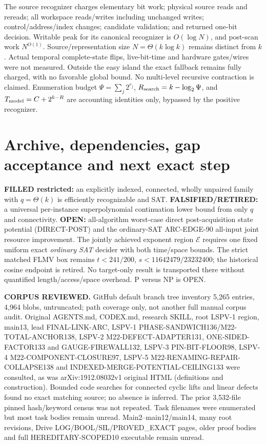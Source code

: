 \documentclass[11pt]{article}
\begin{document}
The source recognizer charges elementary bit work; physical source reads and rereads; all workspace reads/writes including unchanged writes; control/address/index changes; candidate validation; and returned one-bit decision. Writable peak for its canonical recognizer is \(O(\log N)\), and post-scan work \(N^{O(1)}\). Source/representation size \(N=\Theta(k\log k)\) remains distinct from \(k\). Actual temporal complete-state flips, live-bit-time and hardware gates/wires were not measured. Outside the easy island the exact fallback remains fully charged, with no favorable global bound. No multi-level recursive contraction is claimed. Enumeration budget \(\Psi=\sum_j2^{r_j}\), \(R_{\rm search}=k-\log_2\Psi\), and \(T_{\rm model}=C+2^{k-R}\) are accounting identities only, bypassed by the positive recognizer.

\section{Archive, dependencies, gap acceptance and next exact step}
\noindent\textbf{FILLED restricted:} an explicitly indexed, connected, wholly unpaired family with \(q=\Theta(k)\) is efficiently recognizable and SAT. \textbf{FALSIFIED/RETIRED:} a universal per-instance superpolynomial continuation lower bound from only \(q\) and connectivity. \textbf{OPEN:} all-algorithm worst-case direct post-acquisition state potential (DIRECT-POST) and the ordinary-SAT ARC-EDGE-90 all-input joint resource improvement. The jointly achieved exponent region \(\mathcal E\) requires one fixed uniform exact \emph{ordinary SAT} decider with both time/space bounds. The strict matched FLMV box remains \(t<241/200\), \(s<11642479/23232400\); the historical cosine endpoint is retired. No target-only result is transported there without quantified length/access/space overhead. P versus NP is OPEN.

\noindent\textbf{CORPUS REVIEWED.} GitHub default branch tree inventory 5,265 entries, 4,964 blobs, untruncated; path coverage only, not another full manual corpus audit. Original AGENTS.md, CODEX.md, research SKILL, root LSPV-1 region, main13, lead FINAL-LINK-ARC, LSPV-1 PHASE-SANDWICH136/M22-TOTAL-ANCHOR138, LSPV-2 M22-DEFECT-ADAPTER131, ONE-SIDED-FACTOR133 and GAUGE-FIREWALL132, LSPV-3 PIN-BIT-FLOOR98, LSPV-4 M22-COMPONENT-CLOSURE97, LSPV-5 M22-RENAMING-REPAIR-COLLAPSE138 and INDEXED-MERGE-POTENTIAL-CEILING133 were consulted, as was arXiv:1912.08032v1 original HTML (definitions and construction). Bounded code searches for connected cyclic lifts and linear defects found no exact matching source; no absence is inferred. The prior 3,532-file pinned hash/keyword census was not repeated. Task filenames were enumerated but most task bodies remain unread. Main2--main12/main14, many root revisions, Drive LOG/BOOL/SIL/PROVED_EXACT pages, older proof bodies and full HEREDITARY-SCOPED10 executable remain unread.
\end{document}
